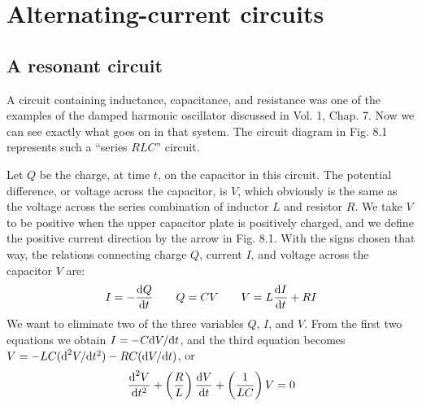 \chapter{Alternating-current circuits}

\section{A resonant circuit}

A circuit containing inductance, capacitance, and resistance was
one of the examples of the damped harmonic oscillator discussed in
Vol. 1, Chap. 7. Now we can see exactly what goes on in that system.
The circuit diagram in Fig. 8.1 represents such a ``series $RLC$'' circuit.

Let $Q$ be the charge, at time $t$, on the capacitor in this circuit. The
potential difference, or voltage across the capacitor, is $V$, which
obviously is the same as the voltage across the series combination
of inductor $L$ and resistor $R$. We take $V$ to be positive when the upper
capacitor plate is positively charged, and we define the positive current
direction by the arrow in Fig. 8.1. With the signs chosen that
way, the relations connecting charge $Q$, current $I$, and voltage across
the capacitor $V$ are:
\begin{equation}
  I=-\frac{\textup{d} Q}{\textup{d} t} \qquad
  Q = CV \qquad
  V=L\frac{\textup{d} I}{\textup{d} t}+RI
\end{equation}
We want to eliminate two of the three variables $Q$, $I$, and $V$. From
the first two equations we obtain $I = - C \textup{d} V/\textup{d} t$, and the third equation
becomes $V = -LC(\textup{d}^2V/\textup{d} t^2) - RC(\textup{d} V/\textup{d} t)$, or
\begin{equation}
  \frac{\textup{d}^2V}{\textup{d} t^2} + \left(\frac{R}{L}\right) \frac{\textup{d} V}{\textup{d} t} + \left(\frac{1}{LC}\right) V = 0
\end{equation}

